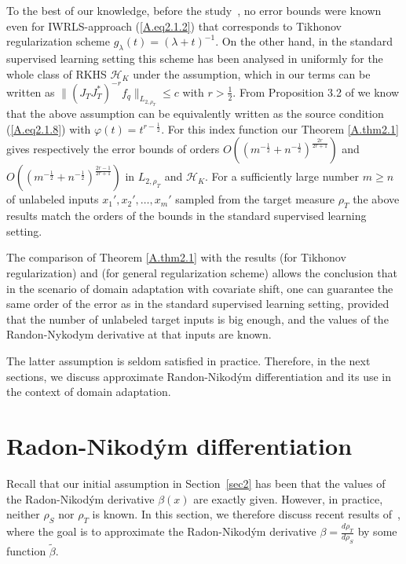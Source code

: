 \documentclass[USenglish]{article}
\begin{document}
To the best of our knowledge, before the study~\cite{gizewski2022regularization}, no error bounds were known even for IWRLS-approach (\ref{A.eq2.1.2}) that corresponds to Tikhonov regularization scheme $g_\lambda (t) = (\lambda + t)^{-1}.$ On the other hand, in the standard supervised learning setting this scheme has been analysed in \cite{smale2007} uniformly for the whole class of RKHS $\mathcal{H}_K$ under the assumption, which in our terms can be written as $\| (J_TJ_T^*)^{-r} f_q \|_{L_{2,\rho_T}} \leq c$ with $r > \frac{1}{2}.$ From Proposition 3.2 of \cite{devito2006} we know that the above assumption can be equivalently written as the source condition (\ref{A.eq2.1.8}) with $\varphi (t) = t^{r - \frac{1}{2}}.$ For this index function our Theorem \ref{A.thm2.1} gives respectively the error bounds of orders $O\left( (m^{-\frac{1}{2}} + n^{-\frac{1}{2}})^{\frac{2r}{2r + 1}}\right)$ and  $O\left( (m^{-\frac{1}{2}} + n^{-\frac{1}{2}})^{\frac{2r-1}{2r + 1}}\right)$ in $L_{2,\rho_T}$ and $\mathcal{H}_K$. For a sufficiently large number $m \geq n$ of unlabeled inputs $x_1',x_2',\ldots,x_m'$ sampled from the target measure $\rho_T$ the above results match the orders of the bounds \cite{smale2007} in the standard supervised learning setting.

The comparison of Theorem \ref{A.thm2.1} with the results \cite{smale2007} (for Tikhonov regularization) and \cite{bauer2007} (for general regularization scheme) allows the conclusion that in the scenario of domain adaptation with covariate shift, one can guarantee the same order of the error as in the standard supervised learning setting, provided that the number of unlabeled target inputs is big enough, and the values of the Randon-Nykodym derivative at that inputs are known.

The latter assumption is seldom satisfied in practice. Therefore, in the next sections, we discuss approximate Randon-Nikod\'ym differentiation and its use in the context of domain adaptation.










\section{Radon-Nikod\'ym differentiation}
\label{sec:radon_Nikod\'ym_differentiation}

Recall that 
our initial assumption in Section~\ref{sec2} has been that the values of the Radon-Nikod\'ym derivative $\beta(x)$ are exactly given.
However, in practice, neither $\rho_S$ nor $\rho_T$ is known.
In this section, we therefore discuss recent results of~\cite{gizewski2022regularization,nguyen2023regularized}, where the goal is to approximate the Radon-Nikod\'ym derivative $\beta = \frac{d\rho_T}{d\rho_S} $ by some function $ \tilde{\beta}$.
\end{document}
